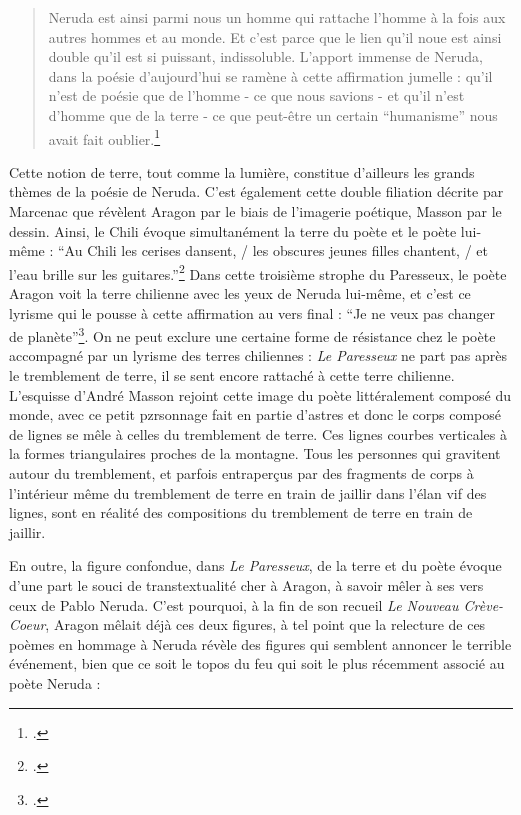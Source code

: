 \begin{quote}
Neruda est ainsi parmi nous un homme qui rattache l’homme à la fois aux autres hommes et au monde. Et c’est parce que le lien qu’il noue est ainsi double qu’il est si puissant, indissoluble. L’apport immense de Neruda, dans la poésie d’aujourd’hui se ramène à cette affirmation jumelle : qu’il n’est de poésie que de l’homme - ce que nous savions - et qu’il n’est d’homme que de la terre - ce que peut-être un certain \enquote{humanisme} nous avait fait oublier.\footcite[p119]{pabloneruda}\end{quote}

Cette notion de terre, tout comme la lumière, constitue d’ailleurs les grands thèmes de la poésie de Neruda. C’est également cette double filiation décrite par Marcenac que révèlent Aragon par le biais de l’imagerie poétique, Masson par le dessin. Ainsi, le Chili évoque simultanément la terre du poète et le poète lui-même : \enquote{Au Chili les cerises dansent, / les obscures jeunes filles chantent, / et l'eau brille sur les guitares.}\footcite{pabloneruda} Dans cette troisième strophe du Paresseux, le poète Aragon voit la terre chilienne avec les yeux de Neruda lui-même, et c’est ce lyrisme qui le pousse à cette affirmation au vers final : \enquote{Je ne veux pas changer de planète}\footcite{pabloneruda}.  On ne peut exclure une certaine forme de résistance chez le poète accompagné par un lyrisme des terres chiliennes : \emph{Le Paresseux }ne part pas après le tremblement de terre, il se sent encore rattaché à cette terre chilienne. L’esquisse d’André Masson rejoint cette image du poète littéralement composé du monde, avec ce petit pzrsonnage fait en partie d’astres et donc le corps composé de lignes se mêle à celles du tremblement de terre. Ces lignes courbes verticales à la formes triangulaires proches de la montagne. Tous les personnes qui gravitent autour du tremblement, et parfois entraperçus par des fragments de corps à l’intérieur même du tremblement de terre en train de jaillir dans l’élan vif des lignes, sont en réalité des compositions du tremblement de terre en train de jaillir. 

	En outre, la figure confondue, dans \emph{Le Paresseux}, de la terre et du poète évoque d’une part le souci de transtextualité cher à Aragon, à savoir mêler à ses vers ceux de Pablo Neruda. C’est pourquoi, à la fin de son recueil \emph{Le Nouveau Crève-Coeur}, Aragon mêlait déjà ces deux figures, à tel point que la relecture de ces poèmes en hommage à Neruda révèle des figures qui semblent annoncer le terrible événement, bien que ce soit le topos du feu qui soit le plus récemment associé au poète Neruda : 

